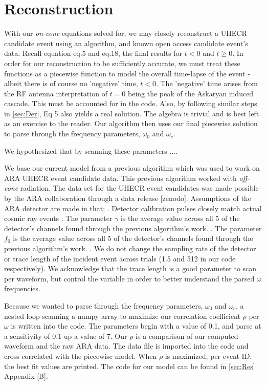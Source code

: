 \documentclass[amsmath,amssymb,aps,prd,10pt,twocolumn,showkeys]{revtex4}
\begin{document}
\section{Reconstruction}
\label{sec:Rec}
With our \textit{on-cone} equations solved for, we may closely reconstruct a UHECR candidate event using an algorithm, and known open access candidate event's data. Recall equation eq.5 and eq.18, the final results for $t<0$ and $t\ge0$. In order for our reconstruction to be sufficiently accurate, we must treat these functions as a piecewise function to model the overall time-lapse of the event -albeit there is of course no 'negative' time, $t<0$. The 'negative' time arises from the RF antenna interpretation of $t=0$ being the peak of the Askaryan induced cascade. This must be accounted for in the code. Also, by following similar steps in \ref{sec:Der}, Eq 5 also yields a real solution. The algebra is trivial and is best left as an exercise to the reader. Our algorithm then uses our final piecewise solution to parse through the frequency parameters, $\omega_0$ and $\omega_c$.   

We hypothesized that by scanning these parameters .... 

We base our current model from a previous algorithm which was used to work on ARA UHECR event candidate data. This previous algorithm worked with \textit{off-cone} radiation. The data set for the UHECR event candidates was made possible by the ARA collaboration through a data release [zenodo]. Assumptions of the ARA detector are made in that; . Detector calibration pulses closely match actual cosmic ray events . The parameter $\gamma$ is the average value across all 5 of the detector's channels found through the previous algorithm's work. . The parameter $f_0$ is the average value across all 5 of the detector's channels found through the previous algorithm's work. . We do not change the sampling rate of the detector or trace length of the incident event across trials (1.5 and 512 in our code respectively). We acknowledge that the trace length is a good parameter to scan per waveform, but control the variable in order to better understand the parsed $\omega$ frequencies.

Because we wanted to parse through the frequency parameters, $\omega_0$ and $\omega_c$, a nested loop scanning a numpy array to maximize our correlation coefficient $\rho$ per $\omega$ is written into the code. The parameters begin with a value of 0.1, and parse at a sensitivity of 0.1 up a value of 7. Our $\rho$ is a comparison of our computed waveform and the raw ARA data. The data file is imported into the code and cross correlated with the piecewise model. When $\rho$ is maximized, per event ID, the best fit values are printed. 
The code for our model can be found in \ref{sec:Res} Appendix [B]. 
\end{document}
